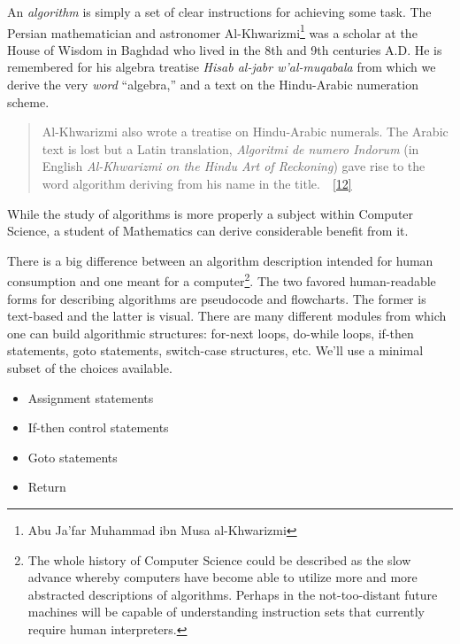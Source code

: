 \documentclass[10pt,]{book}
\theoremstyle{plain}
\theoremstyle{definition}
\theoremstyle{definition}
\numberwithin{equation}{section}
\begin{document}
    An \emph{algorithm} is simply a set of clear
    instructions for achieving
    some task. The Persian mathematician and astronomer
    Al-Khwarizmi\footnote{Abu Ja'far Muhammad ibn Musa al-Khwarizmi\label{fn-6}} was a
    scholar at the House of Wisdom in Baghdad who lived in the 8th and 9th
    centuries A.D. He is remembered for his algebra treatise \emph{Hisab
    al-jabr w'al-muqabala} from which we derive the very \emph{word}
    ``algebra,'' and a text on the Hindu-Arabic numeration scheme.
\begin{quote}
  Al-Khwarizmi also wrote a treatise on Hindu-Arabic numerals. The
  Arabic text is lost but a Latin translation, \emph{Algoritmi de numero
  Indorum} (in English \emph{Al-Khwarizmi on the Hindu Art of Reckoning}) gave
  rise to the word algorithm deriving from his name in the
  title.~~\hyperlink{HisMathArch}{[12]}\end{quote}
\par

    While the study of algorithms is more properly a subject within
    Computer Science, a student of Mathematics can derive considerable
    benefit from it.
\par

  There is a big difference between an algorithm description intended
  for human consumption and one meant for a computer\footnote{The 
  whole history of Computer Science could be
    described as the slow advance whereby computers have become  able to
    utilize more and more abstracted descriptions of algorithms. 
    Perhaps in the not-too-distant future machines will be capable of
    understanding instruction sets that currently require human interpreters.\label{fn-7}}.
  The two favored human-readable forms for describing
  algorithms are  pseudocode and 
  flowcharts. The former is text-based
  and the latter is visual. There are many different modules from which
  one can build algorithmic structures: for-next loops, do-while loops, if-then
  statements, goto statements, switch-case structures, etc. We'll use
  a minimal subset of the choices available.

  \leavevmode%
\begin{itemize}[label=\textbullet]
\item{}
        Assignment statements
\item{}
        If-then control statements
\item{}
        Goto statements
\item{}
        Return
\end{itemize}
\end{document}
